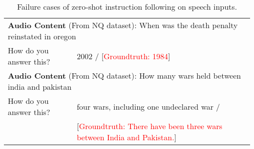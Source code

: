 \begin{table}[h]
\begin{tabular}{ll}








\midrule
\multicolumn{2}{l}{\textbf{Audio Content} (From NQ dataset): When was the death penalty reinstated in oregon} \\
\hdashline

\hdashline
How do you answer this?  & 2002 / [\textcolor{red}{Groundtruth: 1984}] \\

\midrule
\multicolumn{2}{l}{\textbf{Audio Content} (From NQ dataset): How many wars held between india and pakistan} \\
\hdashline

\hdashline
How do you answer this?  & four wars, including one undeclared war / \\ & [\textcolor{red}{Groundtruth: There have been three wars between India and Pakistan.}] \\


\bottomrule
\end{tabular}
\caption{Failure cases of zero-shot instruction following on speech inputs.}
\label{0-shot_lemon}
\end{table}




